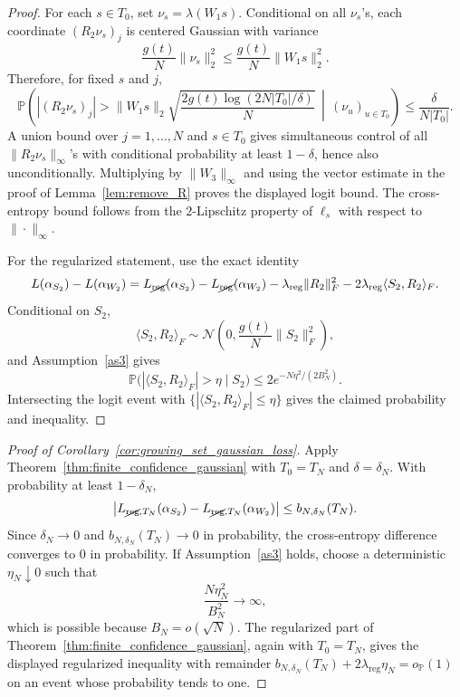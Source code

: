 \documentclass[11pt]{article}
\theoremstyle{plain}
\theoremstyle{definition}
\theoremstyle{remark}
\newcommand{\PP}{\mathbb{P}}
\newcommand{\1}{\mathbf{1}}
\begin{document}
\begin{proof}
For each \(s\in T_0\), set \(\nu_s=\lambda(W_1s)\). Conditional on all \(\nu_s\)'s, each coordinate \((R_2\nu_s)_j\) is centered Gaussian with variance
\[
\frac{g(t)}{N}\|\nu_s\|_2^2
\le
\frac{g(t)}{N}\|W_1s\|_2^2.
\]
Therefore, for fixed \(s\) and \(j\),
\[
\PP\!\left(
|(R_2\nu_s)_j|
>
\|W_1s\|_2\sqrt{\frac{2g(t)\log(2N|T_0|/\delta)}{N}}
\,\middle|\,(\nu_u)_{u\in T_0}
\right)
\le
\frac{\delta}{N|T_0|}.
\]
A union bound over \(j=1,\dots,N\) and \(s\in T_0\) gives simultaneous control of all \(\|R_2\nu_s\|_\infty\)'s with conditional probability at least \(1-\delta\), hence also unconditionally. Multiplying by \(\|W_3\|_\infty\) and using the vector estimate in the proof of Lemma~\ref{lem:remove_R} proves the displayed logit bound. The cross-entropy bound follows from the \(2\)-Lipschitz property of \(\ell_s\) with respect to \(\|\cdot\|_\infty\).

For the regularized statement, use the exact identity
\[
L(\alpha_{S_2})-L(\alpha_{W_2})
=
L_{\cancel{\mathrm{reg}}}(\alpha_{S_2})-L_{\cancel{\mathrm{reg}}}(\alpha_{W_2})
-\lambda_{\mathrm{reg}}\|R_2\|_F^2
-2\lambda_{\mathrm{reg}}\langle S_2,R_2\rangle_F.
\]
Conditional on \(S_2\),
\[
\langle S_2,R_2\rangle_F
\sim
\mathcal N\!\left(0,\frac{g(t)}{N}\|S_2\|_F^2\right),
\]
and Assumption~\ref{as3} gives
\[
\PP\big(|\langle S_2,R_2\rangle_F|>\eta\mid S_2\big)
\le
2e^{-N\eta^2/(2B_N^2)}.
\]
Intersecting the logit event with \(\{|\langle S_2,R_2\rangle_F|\le\eta\}\) gives the claimed probability and inequality.
\end{proof}

\begin{proof}[Proof of Corollary~\ref{cor:growing_set_gaussian_loss}]
Apply Theorem~\ref{thm:finite_confidence_gaussian} with \(T_0=T_N\) and \(\delta=\delta_N\). With probability at least \(1-\delta_N\),
\[
\left|
L_{\cancel{\mathrm{reg}},T_N}(\alpha_{S_2})
-
L_{\cancel{\mathrm{reg}},T_N}(\alpha_{W_2})
\right|
\le b_{N,\delta_N}(T_N).
\]
Since \(\delta_N\to0\) and \(b_{N,\delta_N}(T_N)\to0\) in probability, the cross-entropy difference converges to \(0\) in probability. If Assumption~\ref{as3} holds, choose a deterministic \(\eta_N\downarrow0\) such that
\[
\frac{N\eta_N^2}{B_N^2}\to\infty,
\]
which is possible because \(B_N=o(\sqrt N)\). The regularized part of Theorem~\ref{thm:finite_confidence_gaussian}, again with \(T_0=T_N\), gives the displayed regularized inequality with remainder \(b_{N,\delta_N}(T_N)+2\lambda_{\mathrm{reg}}\eta_N=o_{\PP}(1)\) on an event whose probability tends to one.
\end{proof}
\end{document}
